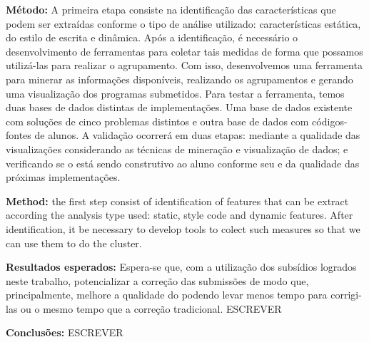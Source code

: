 \documentclass[12pt,english,brazil,a4paper,utf8,oneside]{utfpr-tcc}
\begin{document}
\begin{resumo}
\textbf{Método:} A primeira etapa consiste na identificação das características que
podem ser extraídas conforme o tipo de análise utilizado: características estática, do
estilo de escrita e dinâmica. Após a identificação, é necessário o desenvolvimento
de ferramentas para coletar tais medidas de forma que possamos utilizá-las para realizar
o agrupamento. Com isso, desenvolvemos uma ferramenta para minerar as informações
disponíveis, realizando os agrupamentos e gerando uma visualização dos programas submetidos.
Para testar a ferramenta, temos duas bases de dados distintas de implementações. Uma
base de dados existente com soluções de cinco problemas distintos e outra base de dados
com códigos-fontes de alunos. A validação ocorrerá em duas etapas: mediante a qualidade
das visualizações considerando as técnicas de mineração e visualização de dados; e
verificando se o  está sendo construtivo ao aluno conforme seu
 e da qualidade das próximas implementações.

\textbf{Method:} the first step consist of identification of features that can be
extract according the analysis type used: static, style code and dynamic features. After
identification, it be necessary to develop tools to colect such measures so that we
can use them to do the cluster.

\textbf{Resultados esperados:} Espera-se que, com a utilização dos subsídios logrados
neste trabalho, potencializar a correção das submissões de modo que, principalmente,
melhore a qualidade do  podendo levar menos tempo para corrigi-las
ou o mesmo tempo que a correção tradicional. ESCREVER

\textbf{Conclusões:} ESCREVER


\end{resumo}



\end{document}
